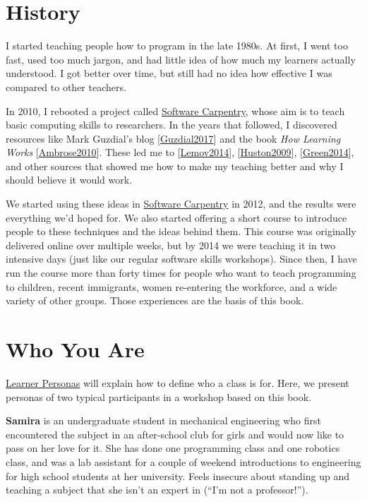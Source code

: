 \documentclass[10pt,statementpaper]{memoir}
\begin{document}
\section{History}\label{history}

I started teaching people how to program in the late 1980s. At first, I
went too fast, used too much jargon, and had little idea of how much my
learners actually understood. I got better over time, but still had no
idea how effective I was compared to other teachers.

In 2010, I rebooted a project called
\href{http://software-carpentry.org}{Software Carpentry}, whose aim is
to teach basic computing skills to researchers. In the years that
followed, I discovered resources like Mark Guzdial's blog
{[}\href{biblio.html\#guzdial-blog}{Guzdial2017}{]} and the book
\emph{How Learning Works}
{[}\href{biblio.html\#ambrose-hlw}{Ambrose2010}{]}. These led me to
{[}\href{biblio.html\#lemov-champion}{Lemov2014}{]},
{[}\href{biblio.html\#huston-dont-know}{Huston2009}{]},
{[}\href{biblio.html\#green-babt}{Green2014}{]}, and other sources that
showed me how to make my teaching better and why I should believe it
would work.

We started using these ideas in
\href{http://software-carpentry.org}{Software Carpentry} in 2012, and
the results were everything we'd hoped for. We also started offering a
short course to introduce people to these techniques and the ideas
behind them. This course was originally delivered online over multiple
weeks, but by 2014 we were teaching it in two intensive days (just like
our regular software skills workshops). Since then, I have run the
course more than forty times for people who want to teach programming to
children, recent immigrants, women re-entering the workforce, and a wide
variety of other groups. Those experiences are the basis of this book.

\section{Who You Are}\label{who-you-are}

\href{lessons.html\#learner-personas}{Learner Personas} will explain how
to define who a class is for. Here, we present personas of two typical
participants in a workshop based on this book.

\textbf{Samira} is an undergraduate student in mechanical engineering
who first encountered the subject in an after-school club for girls and
would now like to pass on her love for it. She has done one programming
class and one robotics class, and was a lab assistant for a couple of
weekend introductions to engineering for high school students at her
university. Feels insecure about standing up and teaching a subject that
she isn't an expert in (``I'm not a professor!'').
\end{document}
